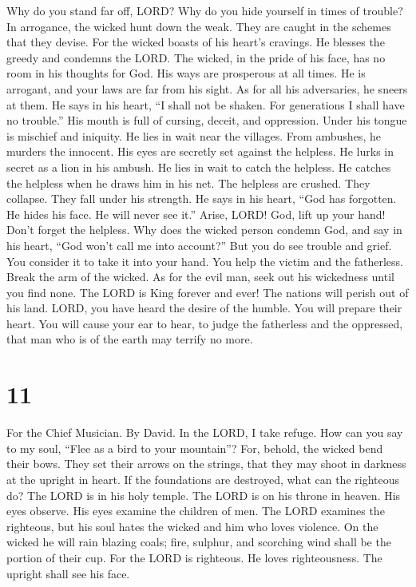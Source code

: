  Why do you stand far off, LORD? Why do you hide yourself in
times of trouble?  In arrogance, the wicked hunt down the
weak. They are caught in the schemes that they devise.  For
the wicked boasts of his heart's cravings. He blesses the greedy and
condemns the LORD.  The wicked, in the pride of his face,
has no room in his thoughts for God.  His ways are
prosperous at all times. He is arrogant, and your laws are far from his
sight. As for all his adversaries, he sneers at them.  He
says in his heart, ``I shall not be shaken. For generations I shall have
no trouble.''  His mouth is full of cursing, deceit, and
oppression. Under his tongue is mischief and iniquity.  He
lies in wait near the villages. From ambushes, he murders the innocent.
His eyes are secretly set against the helpless.  He lurks in
secret as a lion in his ambush. He lies in wait to catch the helpless.
He catches the helpless when he draws him in his net.  The
helpless are crushed. They collapse. They fall under his strength.
 He says in his heart, ``God has forgotten. He hides his
face. He will never see it.''  Arise, LORD! God, lift up
your hand! Don't forget the helpless.  Why does the wicked
person condemn God, and say in his heart, ``God won't call me into
account?''  But you do see trouble and grief. You consider
it to take it into your hand. You help the victim and the fatherless.
 Break the arm of the wicked. As for the evil man, seek out
his wickedness until you find none.  The LORD is King
forever and ever! The nations will perish out of his land. 
LORD, you have heard the desire of the humble. You will prepare their
heart. You will cause your ear to hear,  to judge the
fatherless and the oppressed, that man who is of the earth may terrify
no more.

\hypertarget{section-10}{%
\section{11}\label{section-10}}

For the Chief Musician. By David.  In the LORD, I take
refuge. How can you say to my soul, ``Flee as a bird to your mountain''?
 For, behold, the wicked bend their bows. They set their
arrows on the strings, that they may shoot in darkness at the upright in
heart.  If the foundations are destroyed, what can the
righteous do?  The LORD is in his holy temple. The LORD is
on his throne in heaven. His eyes observe. His eyes examine the children
of men.  The LORD examines the righteous, but his soul hates
the wicked and him who loves violence.  On the wicked he
will rain blazing coals; fire, sulphur, and scorching wind shall be the
portion of their cup.  For the LORD is righteous. He loves
righteousness. The upright shall see his face.

